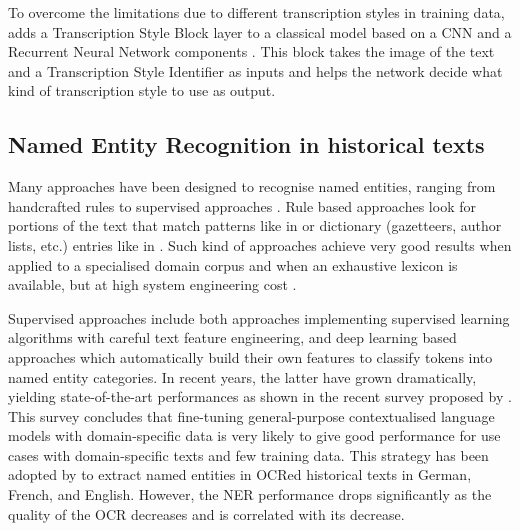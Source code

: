 To overcome the limitations due to different transcription styles in training data, \peroocr adds a Transcription Style Block layer to a classical model based on a CNN and a Recurrent Neural Network components \cite{kohut2021ts}.
This block takes the image of the text and a Transcription Style Identifier as inputs and helps the network decide what kind of transcription style to use as output.





\subsection{Named Entity Recognition in historical texts}
\label{subsection:stoa-ner-on-historical-texts}

Many approaches have been designed to recognise named entities, ranging from handcrafted rules to supervised approaches \cite{nadeau2007}.
Rule based approaches look for portions of the text that match patterns like in \cite{bell2020automated,nouvel2011} or dictionary (gazetteers, author lists, etc.) entries like in \cite{mansouri2008,maurel2011}.
Such kind of approaches achieve very good results when applied to a specialised domain corpus and when an exhaustive lexicon is available, but at high system engineering cost \cite{nadeau2007}. 

Supervised approaches include both approaches implementing supervised learning algorithms with careful text feature engineering, and deep learning based approaches which automatically build their own features to classify tokens into named entity categories.
In recent years, the latter have grown dramatically, yielding state-of-the-art performances as shown in the recent survey proposed by \cite{li2020}. This survey concludes that fine-tuning general-purpose contextualised language models with domain-specific data is very likely to give good performance for use cases with domain-specific texts and few training data. This strategy has been adopted by \cite{Labusch2020NamedED} to extract named entities in OCRed historical texts in German, French, and English. However, the NER performance drops significantly as the quality of the OCR decreases and is correlated with its decrease.

